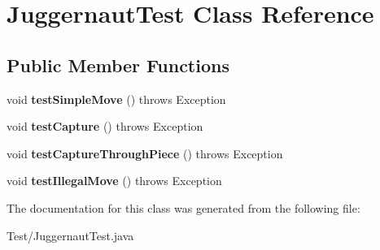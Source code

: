 \hypertarget{class_juggernaut_test}{}\section{Juggernaut\+Test Class Reference}
\label{class_juggernaut_test}
\subsection*{Public Member Functions}
\begin{DoxyCompactItemize}
\item 
\hypertarget{class_juggernaut_test_a10642eab884fa12d22017b7c88886ae6}{}void {\bfseries test\+Simple\+Move} ()  throws Exception \label{class_juggernaut_test_a10642eab884fa12d22017b7c88886ae6}

\item 
\hypertarget{class_juggernaut_test_a7b2d4cc81b3fa2116d23a961cae50f1b}{}void {\bfseries test\+Capture} ()  throws Exception \label{class_juggernaut_test_a7b2d4cc81b3fa2116d23a961cae50f1b}

\item 
\hypertarget{class_juggernaut_test_aed8ab48bc46a7d8679ede8cd876ff36e}{}void {\bfseries test\+Capture\+Through\+Piece} ()  throws Exception \label{class_juggernaut_test_aed8ab48bc46a7d8679ede8cd876ff36e}

\item 
\hypertarget{class_juggernaut_test_aa39748f749c7cf3f7876c4a7e236c604}{}void {\bfseries test\+Illegal\+Move} ()  throws Exception \label{class_juggernaut_test_aa39748f749c7cf3f7876c4a7e236c604}

\end{DoxyCompactItemize}


The documentation for this class was generated from the following file\+:\begin{DoxyCompactItemize}
\item 
Test/Juggernaut\+Test.\+java\end{DoxyCompactItemize}
